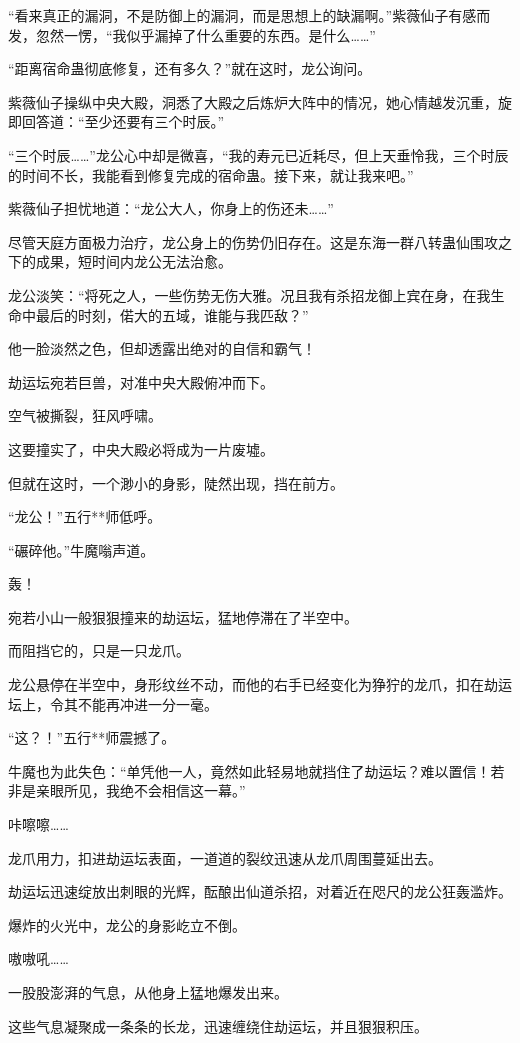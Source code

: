 \begin{this_body}
“看来真正的漏洞，不是防御上的漏洞，而是思想上的缺漏啊。”紫薇仙子有感而发，忽然一愣，“我似乎漏掉了什么重要的东西。是什么……”

“距离宿命蛊彻底修复，还有多久？”就在这时，龙公询问。

紫薇仙子操纵中央大殿，洞悉了大殿之后炼炉大阵中的情况，她心情越发沉重，旋即回答道：“至少还要有三个时辰。”

“三个时辰……”龙公心中却是微喜，“我的寿元已近耗尽，但上天垂怜我，三个时辰的时间不长，我能看到修复完成的宿命蛊。接下来，就让我来吧。”

紫薇仙子担忧地道：“龙公大人，你身上的伤还未……”

尽管天庭方面极力治疗，龙公身上的伤势仍旧存在。这是东海一群八转蛊仙围攻之下的成果，短时间内龙公无法治愈。

龙公淡笑：“将死之人，一些伤势无伤大雅。况且我有杀招龙御上宾在身，在我生命中最后的时刻，偌大的五域，谁能与我匹敌？”

他一脸淡然之色，但却透露出绝对的自信和霸气！

劫运坛宛若巨兽，对准中央大殿俯冲而下。

空气被撕裂，狂风呼啸。

这要撞实了，中央大殿必将成为一片废墟。

但就在这时，一个渺小的身影，陡然出现，挡在前方。

“龙公！”五行**师低呼。

“碾碎他。”牛魔嗡声道。

轰！

宛若小山一般狠狠撞来的劫运坛，猛地停滞在了半空中。

而阻挡它的，只是一只龙爪。

龙公悬停在半空中，身形纹丝不动，而他的右手已经变化为狰狞的龙爪，扣在劫运坛上，令其不能再冲进一分一毫。

“这？！”五行**师震撼了。

牛魔也为此失色：“单凭他一人，竟然如此轻易地就挡住了劫运坛？难以置信！若非是亲眼所见，我绝不会相信这一幕。”

咔嚓嚓……

龙爪用力，扣进劫运坛表面，一道道的裂纹迅速从龙爪周围蔓延出去。

劫运坛迅速绽放出刺眼的光辉，酝酿出仙道杀招，对着近在咫尺的龙公狂轰滥炸。

爆炸的火光中，龙公的身影屹立不倒。

嗷嗷吼……

一股股澎湃的气息，从他身上猛地爆发出来。

这些气息凝聚成一条条的长龙，迅速缠绕住劫运坛，并且狠狠积压。


\end{this_body}
